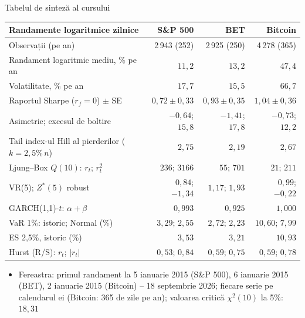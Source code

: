 \begin{frame}{Tabelul de sinteză al cursului}
\itemsize{\footnotesize}
\begin{center}
\scriptsize
\begin{tabular}{lrrr}
\toprule
\textbf{Randamente logaritmice zilnice} & S\&P 500 & BET & Bitcoin \\
\midrule
Observații (pe an) & 2\,943 (252) & 2\,925 (250) & 4\,278 (365) \\
Randament logaritmic mediu, \% pe an & $11{,}2$ & $13{,}2$ & $47{,}4$ \\
Volatilitate, \% pe an & $17{,}7$ & $15{,}5$ & $66{,}7$ \\
Raportul Sharpe ($r_f = 0$) $\pm$ SE & $0{,}72 \pm 0{,}33$ & $0{,}93 \pm 0{,}35$ & $1{,}04 \pm 0{,}36$ \\
Asimetrie; excesul de boltire & $-0{,}64$; $15{,}8$ & $-1{,}41$; $17{,}8$ & $-0{,}73$; $12{,}2$ \\
Tail index-ul Hill al pierderilor ($k = 2{,}5\%\,n$) & $2{,}75$ & $2{,}19$ & $2{,}67$ \\
Ljung--Box $Q(10)$: $r_t$; $r_t^2$ & $236$; $3166$ & $55$; $701$ & $21$; $211$ \\
VR(5); $Z^*(5)$ robust & $0{,}84$; $-1{,}34$ & $1{,}17$; $1{,}93$ & $0{,}99$; $-0{,}22$ \\
GARCH(1,1)-$t$: $\alpha + \beta$ & $0{,}993$ & $0{,}925$ & $1{,}000$ \\
VaR 1\%: istoric; Normal (\%) & $3{,}29$; $2{,}55$ & $2{,}72$; $2{,}23$ & $10{,}60$; $7{,}99$ \\
ES 2,5\%, istoric (\%) & $3{,}53$ & $3{,}21$ & $10{,}93$ \\
Hurst (R/S): $r_t$; $|r_t|$ & $0{,}53$; $0{,}84$ & $0{,}59$; $0{,}75$ & $0{,}59$; $0{,}78$ \\
\bottomrule
\end{tabular}
\end{center}
\begin{itemize}
    \item Fereastra: primul randament la 5 ianuarie 2015 (S\&P 500), 6 ianuarie 2015 (BET), 2 ianuarie 2015 (Bitcoin) -- 18 septembrie 2026; fiecare serie pe calendarul ei (Bitcoin: 365 de zile pe an); valoarea critică $\chi^2(10)$ la 5\%: $18{,}31$
\end{itemize}
\end{frame}

